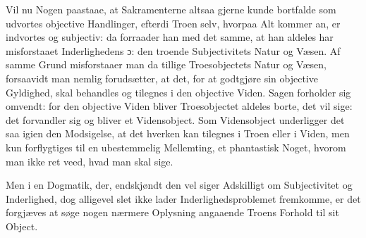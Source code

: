 Vil nu Nogen paastaae, at Sakramenterne altsaa gjerne kunde
bortfalde som udvortes objective Handlinger, efterdi Troen selv,
hvorpaa Alt kommer an, er indvortes og subjectiv: da forraader han
med det samme, at han aldeles har misforstaaet Inderlighedens ɔ:
den troende Subjectivitets Natur og Væsen. Af samme Grund
misforstaaer man da tillige Troesobjectets Natur og Væsen,
forsaavidt man nemlig forudsætter, at det, for at godtgjøre sin
objective Gyldighed, skal behandles og tilegnes i den objective
Viden. Sagen forholder sig omvendt: for den objective Viden bliver
Troesobjectet aldeles borte, det vil sige: det forvandler sig og
bliver et Vidensobject. Som Vidensobject underligger det saa igien
den Modsigelse, at det hverken kan tilegnes i Troen eller i Viden,
men kun forflygtiges til en ubestemmelig Mellemting, et
phantastisk Noget, hvorom man ikke ret veed, hvad man skal sige.

Men i en Dogmatik, der, endskjøndt den vel siger Adskilligt om
Subjectivitet og Inderlighed, dog alligevel slet ikke lader
Inderlighedsproblemet fremkomme, er det
 forgjæves at søge nogen nærmere Oplysning angaaende Troens Forhold
til sit Object.

